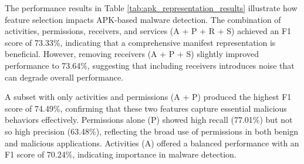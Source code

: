 \begin{table}[b!]
    \caption{\label{tab:apk_representation_results}%
    Performance of different APK representations using frozen modernBERT embeddings. Features are extracted from Android manifest.xml (A=Activities, P=Permissions, R=Receivers, S=Services). Results reported on time-based transcend subset split after five epochs.}
\end{table}

The performance results in Table \ref{tab:apk_representation_results} 
illustrate how feature selection impacts APK-based malware detection. 
The combination of activities, permissions, receivers, and services (A + P + R + S) 
achieved an F1 score of 73.33\%, indicating that a comprehensive manifest representation 
is beneficial. However, removing receivers (A + P + S) 
slightly improved performance to 73.64\%, suggesting that including receivers 
introduces noise that can degrade overall performance.

A subset with only activities and permissions (A + P) produced the highest F1 
score of 74.49\%, confirming that these two features capture essential malicious behaviors 
effectively. Permissions alone (P) showed high recall (77.01\%) 
but not so high precision (63.48\%), 
reflecting the broad use of permissions in both benign and malicious applications. 
Activities (A) offered a balanced performance with an F1 score of 70.24\%, 
indicating  importance in malware detection.

